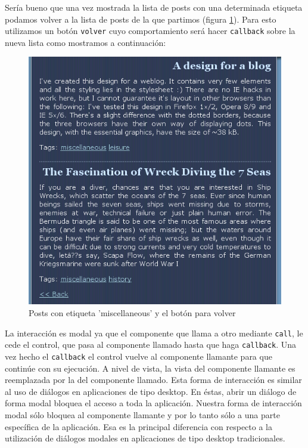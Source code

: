 
Sería bueno que una vez mostrada la lista de posts con una determinada etiqueta podamos volver a la lista de posts de la que partimos (figura \ref{fig-blog2}). Para esto utilizamos un botón \verb"volver" cuyo comportamiento será hacer \verb"callback" sobre la nueva lista como mostramos a continuación:


\begin{figure}[h]
	\centering
	\includegraphics[scale=0.7]{images/blog2.png}
 	\caption{Posts con etiqueta 'miscellaneous' y el botón para volver}
 	\label{fig-blog2}
\end{figure}

La interacción es modal ya que el componente que llama a otro mediante \verb"call", le cede el control, que pasa al componente llamado hasta que haga \verb'callback'. Una vez hecho el \verb'callback' el control vuelve al componente llamante para que continúe con su ejecución. A nivel de vista, la vista del componente llamante es reemplazada por la del componente llamado. Esta forma de interacción es similar al uso de diálogos en aplicaciones de tipo desktop. En éstas, abrir un diálogo de forma modal bloquea el acceso a toda la aplicación. Nuestra forma de interacción modal sólo bloquea al componente llamante y por lo tanto sólo a una parte específica de la aplicación. Esa es la principal diferencia con respecto a la utilización de diálogos modales en aplicaciones de tipo desktop tradicionales.

